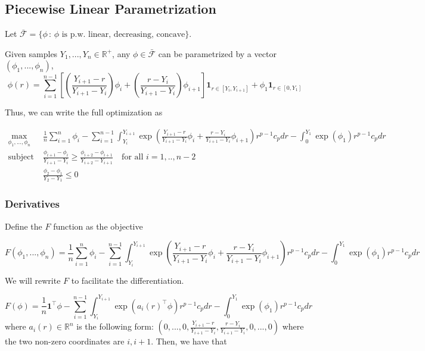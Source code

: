 \documentclass[12pt]{article}
\begin{document}
\subsection{Piecewise Linear Parametrization}

Let $\bar{\mathcal{F}} = \{ \phi \,:\, \text{$\phi$ is p.w. linear, decreasing, concave} \}$. 

Given samples $Y_1,...,Y_n \in \mathbb{R}^+$, any $\phi \in \bar{\mathcal{F}}$ can be parametrized by a vector $(\phi_1, ..., \phi_n)$,
\[
\phi(r) = \sum_{i=1}^{n-1} \left[ 
   \left( \frac{ Y_{i+1} - r }{Y_{i+1} - Y_i} \right) \phi_i +
   \left( \frac{ r - Y_i }{ Y_{i+1} - Y_i } \right) \phi_{i+1} \right] 
   \mathbf{1}_{r \in [Y_i, Y_{i+1}]} + \phi_1 \mathbf{1}_{r \in [0, Y_1]} 
\]

Thus, we can write the full optimization as

\begin{align*}
\max_{ \phi_1, ..., \phi_n} \;& \frac{1}{n} \sum_{i=1}^n \phi_i - 
    \sum_{i=1}^{n-1} \int_{Y_i}^{Y_{i+1}} \exp
       \left( \frac{Y_{i+1} -r}{Y_{i+1} -Y_i} \phi_i + \frac{r -Y_i}{Y_{i+1} -Y_i} \phi_{i+1}\right)
         r^{p-1} c_p dr - 
   \int_0^{Y_1} \exp(\phi_1) r^{p-1} c_p dr \\
  \text{subject to} \;& \frac{\phi_{i+1} - \phi_i}{Y_{i+1} - Y_i} \geq 
                        \frac{\phi_{i+2} - \phi_{i+1}}{Y_{i+2} - Y_{i+1}}  \quad \text{for all $i=1,..,n-2$}\\
             & \frac{\phi_2 - \phi_1}{Y_2 - Y_1} \leq 0
\end{align*}


\subsubsection{Derivatives}


Define the $F$ function as the objective

\[
F(\phi_1,..., \phi_n) =  \frac{1}{n} \sum_{i=1}^n \phi_i - 
    \sum_{i=1}^{n-1} \int_{Y_i}^{Y_{i+1}} \exp
       \left( \frac{Y_{i+1} -r}{Y_{i+1} -Y_i} \phi_i + \frac{r -Y_i}{Y_{i+1} -Y_i} \phi_{i+1}\right)
         r^{p-1} c_p dr - 
   \int_0^{Y_1} \exp(\phi_1) r^{p-1} c_p dr 
\]

We will rewrite $F$ to facilitate the differentiation.

\[
F(\phi) = \frac{1}{n} \mathbf{1}^\top \phi - \sum_{i=1}^{n-1} \int_{Y_i}^{Y_{i+1} }
              \exp(a_i(r)^\top \phi) r^{p-1} c_p dr -
       \int_0^{Y_1} \exp(\phi_1) r^{p-1} c_p dr
\]
where $a_i(r) \in \mathbb{R}^n$ is the following form: $(0,...,0, \frac{Y_{i+1} - r}{Y_{i+1} - Y_i}, \frac{r - Y_i}{Y_{i+1} - Y_i}, 0,..., 0)$ where the two non-zero coordinates are $i, i+1$. Then, we have that
\end{document}

